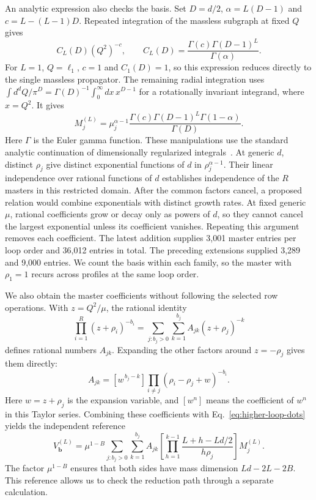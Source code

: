An analytic expression also checks the basis. Set $D=d/2$,
$\alpha=L(D-1)$ and $c=L-(L-1)D$. Repeated integration of the
massless subgraph at fixed $Q$ gives
\begin{equation}
 C_L(D)(Q^2)^{-c},\qquad
 C_L(D)=\frac{\Gamma(c)\Gamma(D-1)^L}{\Gamma(\alpha)} .
 \label{eq:higher-loop-convolution}
\end{equation}
For $L=1$, $Q=\ell_1$, $c=1$ and $C_1(D)=1$, so this expression
reduces directly to the single massless propagator. The remaining radial integration uses
$\int d^dQ/\pi^D=\Gamma(D)^{-1}\int_0^\infty
dx\,x^{D-1}$ for a rotationally invariant integrand, where $x=Q^2$.
It gives
\begin{equation}
 M_j^{(L)}=
 \mu_j^{\alpha-1}
 \frac{\Gamma(c)\Gamma(D-1)^L\Gamma(1-\alpha)}{\Gamma(D)} .
 \label{eq:higher-loop-master-value}
\end{equation}
Here $\Gamma$ is the Euler gamma function. These manipulations use
the standard analytic continuation of dimensionally regularized
integrals~\cite{Weinzierl2022}. At generic $d$, distinct $\rho_j$
give distinct exponential functions of $d$ in
$\rho_j^{\alpha-1}$. Their linear independence over rational
functions of $d$ establishes independence of the $R$ masters in this
restricted domain. After the common factors cancel, a proposed
relation would combine exponentials with distinct growth rates.
At fixed generic $\mu$, rational coefficients grow or decay only
as powers of $d$, so they cannot cancel the largest exponential
unless its coefficient vanishes. Repeating this argument removes
each coefficient. The latest addition supplies 3,001 master entries
per loop order and 36,012 entries in total. The preceding extensions
supplied 3,289 and 9,000 entries. We count the basis
within each family, so the master with $\rho_1=1$ recurs across
profiles at the same loop order.

We also obtain the master coefficients without following the selected
row operations. With $z=Q^2/\mu$, the rational identity
\begin{equation}
 \prod_{i=1}^{R}(z+\rho_i)^{-b_i}
 =\sum_{j:b_j>0}\sum_{k=1}^{b_j}
                 A_{jk}(z+\rho_j)^{-k}
 \label{eq:higher-loop-oracle}
\end{equation}
defines rational numbers $A_{jk}$. Expanding the other factors
around $z=-\rho_j$ gives them directly:
\begin{equation}
 A_{jk}=[w^{\,b_j-k}]
           \prod_{i\ne j}(\rho_i-\rho_j+w)^{-b_i}.
 \label{eq:higher-loop-taylor}
\end{equation}
Here $w=z+\rho_j$ is the expansion variable, and $[w^n]$ means
the coefficient of $w^n$ in this Taylor
series. Combining these coefficients with
Eq.~\eqref{eq:higher-loop-dots} yields the independent reference
\begin{equation}
 V^{(L)}_{\boldsymbol b}
 =\mu^{1-B}\sum_{j:b_j>0}\sum_{k=1}^{b_j}A_{jk}
   \left[\prod_{h=1}^{k-1}
             \frac{L+h-Ld/2}{h\rho_j}\right]M_j^{(L)} .
 \label{eq:higher-loop-reference}
\end{equation}
The factor $\mu^{1-B}$ ensures that both sides have mass dimension
$Ld-2L-2B$. This reference allows us to check the reduction path
through a separate calculation.

